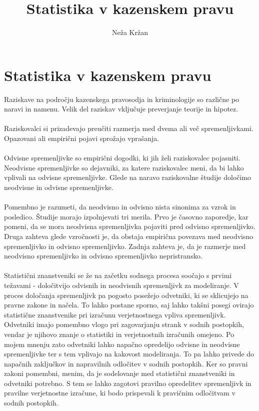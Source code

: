\documentclass[12pt,a4paper]{amsart}
\theoremstyle{definition} %
\theoremstyle{plain} %
\begin{document}
\title{Statistika v kazenskem pravu}
\author{Neža Kržan}
\maketitle

\section{Statistika v kazenskem pravu}
Raziskave na področju kazenskega pravosodja in kriminologije so različne po naravi in namenu. Velik del raziskav vključuje preverjanje teorije in hipotez.\\\\
Raziskovalci si prizadevajo preučiti razmerja med dvema ali več spremenljivkami. Opazovani ali empirični pojavi sprožajo vprašanja.\\\\
Odvisne spremenljivke so empirični dogodki, ki jih želi raziskovalec pojasniti. Neodvisne spremenljivke so dejavniki, za katere raziskovalec meni, da bi lahko vplivali na odvisne 
spremenljivke. Glede na naravo raziskovalne študije določimo neodvisne in odvisne spremenljivke.\\\\
Pomembno je razumeti, da neodvisno in odvisno nista sinonima za vzrok in posledico. Študije morajo izpolnjevati tri merila. Prvo je časovno zaporedje, kar pomeni, 
da se mora neodvisna spremenljivka pojaviti pred odvisno spremenljivko. 
Druga zahteva glede vzročnosti je, da obstaja empirična povezava med neodvisno spremenljivko in odvisno spremenljivko. Zadnja zahteva je, da je razmerje 
med neodvisno spremenljivko in odvisno spremenljivko nepristransko.\\\\
Statistični znanstveniki se že na začetku sodnega procesa soočajo s prvimi težavami - določitvijo odvisnih in neodvisnih spremenljivk za modeliranje. V 
proces določanja spremenljivk pa pogosto posežejo odvetniki, ki se sklicujejo na pravne zakone in načela. To lahko postane sporno, saj lahko takšni 
posegi ovirajo statistične znanstvenike pri izračunu verjetnostnega vpliva spremenljivk. Odvetniki imajo pomembno vlogo pri zagovarjanju strank v 
sodnih postopkih, vendar je njihovo znanje o statistiki in verjetnostnih izračunih omejeno. Po mojem mnenju zato odvetniki lahko napačno opredelijo 
odvisne in neodvisne spremenljivke ter s tem vplivajo na kakovost modeliranja. To pa lahko privede do napačnih zaključkov in napravilnih odločitev v 
sodnih postopkih. Ker so pravni zakoni pomembni, menim, da je sodelovanje med statistični znanstveniki in odvetniki potrebno. S tem se lahko zagotovi pravilno 
opredelitev spremenljivk in pravilne verjetnostne izračune, ki bodo prispevali k pravičnim odločitvam v sodnih postopkih.
\end{document}
